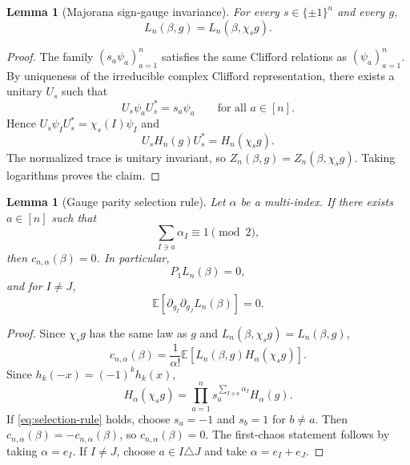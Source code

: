 \documentclass[11pt]{article}
\newtheorem{lemma}[theorem]{Lemma}
\newcommand{\E}{\mathbb{E}}
\begin{document}
\begin{lemma}[Majorana sign-gauge invariance]\label{lem:gauge-invariance}
  For every $s\in\{\pm1\}^n$ and every $g$,
  \begin{equation}\label{eq:gauge-invariance}
    L_n(\beta,g)=L_n(\beta,\chi_sg).
  \end{equation}
\end{lemma}

\begin{proof}
  The family $(s_a\psi_a)_{a=1}^n$ satisfies the same Clifford relations as
  $(\psi_a)_{a=1}^n$.  By uniqueness of the irreducible complex Clifford
  representation, there exists a unitary $U_s$ such that
  \begin{equation}\label{eq:unitary-sign-flip}
    U_s\psi_aU_s^*=s_a\psi_a
    \qquad
    \text{for all }a\in[n].
  \end{equation}
  Hence $U_s\psi_IU_s^*=\chi_s(I)\psi_I$ and
  \begin{equation}\label{eq:H-gauge}
    U_sH_n(g)U_s^*=H_n(\chi_sg).
  \end{equation}
  The normalized trace is unitary invariant, so $Z_n(\beta,g)=Z_n(\beta,\chi_sg)$.
  Taking logarithms proves the claim.
\end{proof}

\begin{lemma}[Gauge parity selection rule]\label{lem:selection}
  Let $\alpha$ be a multi-index.  If there exists $a\in[n]$ such that
  \begin{equation}\label{eq:selection-rule}
    \sum_{I\ni a}\alpha_I\equiv1\pmod2,
  \end{equation}
  then $c_{n,\alpha}(\beta)=0$.  In particular,
  \begin{equation}\label{eq:first-chaos-zero}
    P_1L_n(\beta)=0,
  \end{equation}
  and for $I\neq J$,
  \begin{equation}\label{eq:off-diag-second-zero}
    \E[\partial_{g_I}\partial_{g_J}L_n(\beta)]=0.
  \end{equation}
\end{lemma}

\begin{proof}
  Since $\chi_sg$ has the same law as $g$ and $L_n(\beta,\chi_sg)=L_n(\beta,g)$,
  \begin{equation}\label{eq:coeff-gauge}
    c_{n,\alpha}(\beta)
    =
    \frac1{\alpha!}\E[L_n(\beta,g)H_\alpha(\chi_sg)].
  \end{equation}
  Since $h_k(-x)=(-1)^kh_k(x)$,
  \begin{equation}\label{eq:Hermite-sign}
    H_\alpha(\chi_sg)
    =
    \prod_{a=1}^n s_a^{\sum_{I\ni a}\alpha_I}H_\alpha(g).
  \end{equation}
  If \eqref{eq:selection-rule} holds, choose $s_a=-1$ and $s_b=1$ for
  $b\neq a$.  Then $c_{n,\alpha}(\beta)=-c_{n,\alpha}(\beta)$, so
  $c_{n,\alpha}(\beta)=0$.  The first-chaos statement follows by taking
  $\alpha=e_I$.  If $I\neq J$, choose $a\in I\triangle J$ and take
  $\alpha=e_I+e_J$.
\end{proof}
\end{document}
